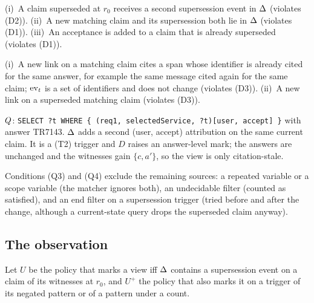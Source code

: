 \begin{example}\label{ex:resup}
(i)~A claim superseded at $r_0$ receives a second supersession event in $\Delta$ (violates (D2)).
(ii)~A new matching claim and its supersession both lie in $\Delta$ (violates (D1)). (iii)~An
acceptance is added to a claim that is already superseded (violates (D1)).
\end{example}

\begin{example}[Evidence]\label{ex:evidence}
(i)~A new link on a matching claim cites a span whose identifier is already cited for the same
answer, for example the same message cited again for the same claim; $\mathrm{ev}_t$ is a set of
identifiers and does not change (violates (D3)). (ii)~A new link on a superseded matching claim (violates (D3)).
\end{example}

\begin{example}\label{ex:level}
$Q$: \texttt{SELECT ?t WHERE \{ (req1, selectedService, ?t)[user, accept] \}} with answer TR7143.
$\Delta$ adds a second (user, accept) attribution on the same current claim. It is a (T2) trigger and
$D$ raises an answer-level mark; the answers are unchanged and the witnesses gain
$\{c,a'\}$, so the view is only citation-stale.
\end{example}

\noindent Conditions (Q3) and (Q4) exclude the remaining sources: a repeated variable or a scope
variable (the matcher ignores both), an undecidable filter (counted as satisfied), and an
$\mathrm{end}$ filter on a supersession trigger (tried before and after the change, although a
current-state query drops the superseded claim anyway).

\subsection{The observation}

Let $U$ be the policy that marks a view iff $\Delta$ contains a supersession event on a claim of its
witnesses at $r_0$, and $U^+$ the policy that also marks it on a trigger of its negated pattern or
of a pattern under a count.

